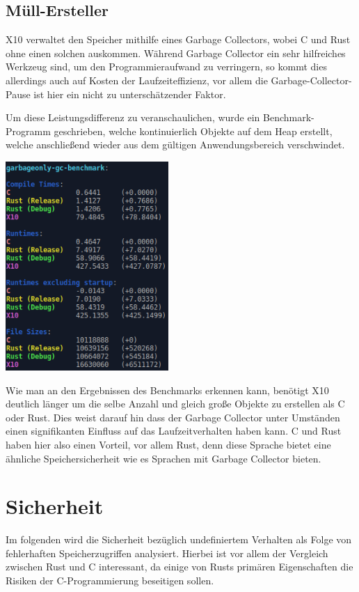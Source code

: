 \subsection{Müll-Ersteller}

X10 verwaltet den Speicher mithilfe eines Garbage Collectors, wobei C und Rust ohne einen solchen auskommen.
Während Garbage Collector ein sehr hilfreiches Werkzeug sind, um den Programmieraufwand zu verringern, so kommt dies
allerdings auch auf Kosten der Laufzeiteffizienz, vor allem die Garbage-Collector-Pause ist hier ein nicht zu unterschätzender
Faktor.

Um diese Leistungsdifferenz zu veranschaulichen, wurde ein Benchmark-Programm geschrieben, welche kontinuierlich
Objekte auf dem Heap erstellt, welche anschließend wieder aus dem gültigen Anwendungsbereich verschwindet.

\begin{center}
	\includegraphics[height=300px]{eval-screenshots/garbageonly.png}
\end{center}

Wie man an den Ergebnissen des Benchmarks erkennen kann, benötigt X10 deutlich länger um die selbe Anzahl und gleich große
Objekte zu erstellen als C oder Rust. Dies weist darauf hin dass der Garbage Collector unter Umständen einen signifikanten
Einfluss auf das Laufzeitverhalten haben kann. C und Rust haben hier also einen Vorteil, vor allem Rust, denn
diese Sprache bietet eine ähnliche Speichersicherheit wie es Sprachen mit Garbage Collector bieten.


\section{Sicherheit}

Im folgenden wird die Sicherheit bezüglich undefiniertem Verhalten als Folge von fehlerhaften Speicherzugriffen analysiert.
Hierbei ist vor allem der Vergleich zwischen Rust und C interessant, da einige von Rusts primären Eigenschaften die
Risiken der C-Programmierung beseitigen sollen.

